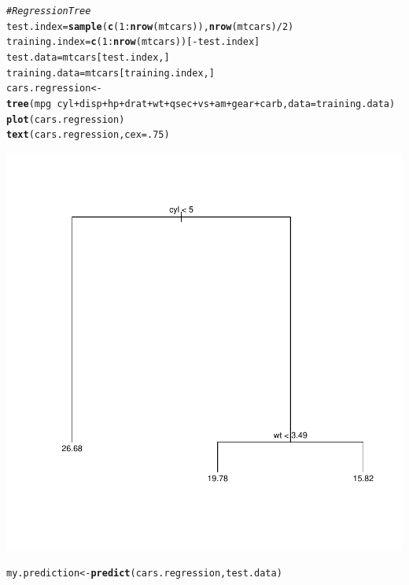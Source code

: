 \documentclass{article}\usepackage[]{graphicx}\usepackage[]{color}
\makeatletter
\def\maxwidth{ %
  \ifdim\Gin@nat@width>\linewidth
    \linewidth
  \else
    \Gin@nat@width
  \fi
}
\newcommand{\hlnum}[1]{\textcolor[rgb]{0.686,0.059,0.569}{#1}}%
\newcommand{\hlcom}[1]{\textcolor[rgb]{0.678,0.584,0.686}{\textit{#1}}}%
\newcommand{\hlopt}[1]{\textcolor[rgb]{0,0,0}{#1}}%
\newcommand{\hlstd}[1]{\textcolor[rgb]{0.345,0.345,0.345}{#1}}%
\newcommand{\hlkwb}[1]{\textcolor[rgb]{0.69,0.353,0.396}{#1}}%
\newcommand{\hlkwc}[1]{\textcolor[rgb]{0.333,0.667,0.333}{#1}}%
\newcommand{\hlkwd}[1]{\textcolor[rgb]{0.737,0.353,0.396}{\textbf{#1}}}%
\newenvironment{kframe}{%
 \def\at@end@of@kframe{}%
 \ifinner\ifhmode%
  \def\at@end@of@kframe{\end{minipage}}%
  \begin{minipage}{\columnwidth}%
 \fi\fi%
 \def\FrameCommand##1{\hskip\@totalleftmargin \hskip-\fboxsep
 \colorbox{shadecolor}{##1}\hskip-\fboxsep
     \hskip-\linewidth \hskip-\@totalleftmargin \hskip\columnwidth}%
 \MakeFramed {\advance\hsize-\width
   \@totalleftmargin\z@ \linewidth\hsize
   \@setminipage}}%
 {\par\unskip\endMakeFramed%
 \at@end@of@kframe}
\newenvironment{knitrout}{}{} %
\makeatother
\begin{document}
\begin{knitrout}
\color{fgcolor}\begin{kframe}
\begin{alltt}
\hlcom{# Regression Tree}
\hlstd{test.index} \hlkwb{=} \hlkwd{sample}\hlstd{(}\hlkwd{c}\hlstd{(}\hlnum{1}\hlopt{:}\hlkwd{nrow}\hlstd{(mtcars)),}\hlkwd{nrow}\hlstd{(mtcars)}\hlopt{/}\hlnum{2} \hlstd{)}
\hlstd{training.index}\hlkwb{=} \hlkwd{c}\hlstd{(}\hlnum{1}\hlopt{:}\hlkwd{nrow}\hlstd{(mtcars))[}\hlopt{-}\hlstd{test.index]}
\hlstd{test.data} \hlkwb{=} \hlstd{mtcars[test.index,]}
\hlstd{training.data} \hlkwb{=} \hlstd{mtcars[training.index,]}
\hlstd{cars.regression} \hlkwb{<-} \hlkwd{tree}\hlstd{(mpg} \hlopt{~} \hlstd{cyl}\hlopt{+}\hlstd{disp}\hlopt{+}\hlstd{hp}\hlopt{+}\hlstd{drat}\hlopt{+}\hlstd{wt}\hlopt{+}\hlstd{qsec}\hlopt{+}\hlstd{vs}\hlopt{+}\hlstd{am}\hlopt{+}\hlstd{gear}\hlopt{+}\hlstd{carb,} \hlkwc{data}\hlstd{=training.data)}
\hlkwd{plot}\hlstd{(cars.regression )}
\hlkwd{text}\hlstd{(cars.regression ,} \hlkwc{cex}\hlstd{=}\hlnum{.75}\hlstd{)}
\end{alltt}
\end{kframe}
\includegraphics[width=\maxwidth]{figure/unnamed-chunk-2-1} 
\begin{kframe}\begin{alltt}
\hlstd{my.prediction} \hlkwb{<-} \hlkwd{predict}\hlstd{(cars.regression, test.data)}

\end{alltt}
\end{kframe}
\end{knitrout}
\end{document}
